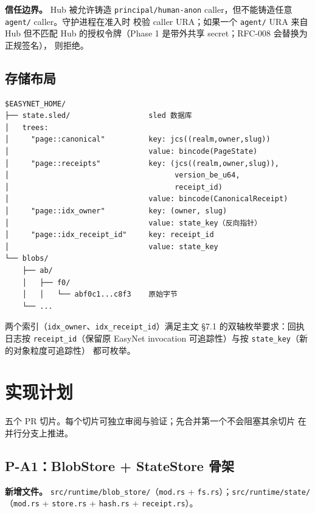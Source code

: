 \documentclass[11pt,a4paper]{article}
\theoremstyle{definition}
\begin{document}
\textbf{信任边界。} Hub 被允许铸造 \texttt{principal/human-anon}
caller，但不能铸造任意 \texttt{agent/} caller。守护进程在准入时
校验 caller URA；如果一个 \texttt{agent/} URA 来自 Hub 但不匹配
Hub 的授权令牌（Phase 1 是带外共享 secret；RFC-008 会替换为正规签名），
则拒绝。

\subsection{存储布局}
\label{sec:storage}

\begin{lstlisting}
$EASYNET_HOME/
├── state.sled/                  sled 数据库
│   trees:
│     "page::canonical"          key: jcs((realm,owner,slug))
│                                value: bincode(PageState)
│     "page::receipts"           key: (jcs((realm,owner,slug)),
│                                      version_be_u64,
│                                      receipt_id)
│                                value: bincode(CanonicalReceipt)
│     "page::idx_owner"          key: (owner, slug)
│                                value: state_key（反向指针）
│     "page::idx_receipt_id"     key: receipt_id
│                                value: state_key
└── blobs/
    ├── ab/
    │   ├── f0/
    │   │   └── abf0c1...c8f3    原始字节
    └── ...
\end{lstlisting}

两个索引（\texttt{idx\_owner}、\texttt{idx\_receipt\_id}）满足主文
\S7.1 的双轴枚举要求：回执日志按 \texttt{receipt\_id}（保留原 EasyNet
invocation 可追踪性）与按 \texttt{state\_key}（新的对象粒度可追踪性）
都可枚举。

\section{实现计划}
\label{sec:impl-plan}

五个 PR 切片。每个切片可独立审阅与验证；先合并第一个不会阻塞其余切片
在并行分支上推进。

\subsection{P-A1：BlobStore + StateStore 骨架}

\textbf{新增文件。} \texttt{src/runtime/blob\_store/}（\texttt{mod.rs}
+ \texttt{fs.rs}）；\texttt{src/runtime/state/}（\texttt{mod.rs} +
\texttt{store.rs} + \texttt{hash.rs} + \texttt{receipt.rs}）。
\end{document}
